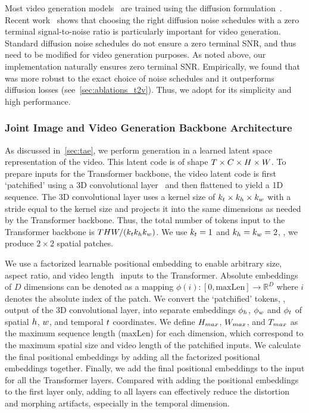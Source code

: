 Most video generation models~\citep{ho2022imagen,emuvideo2023,Blattmann2023AlignYL,singer2023makeavideo} are trained using the diffusion formulation~\citep{pmlr-v37-sohl-dickstein15,Ho2020DenoisingDP,ho2022imagen}.
Recent work~\citep{emuvideo2023,lin2024common} shows that choosing the right diffusion noise schedules with a zero terminal signal-to-noise ratio is particularly important for video generation.
Standard diffusion noise schedules do not ensure a zero terminal SNR, and thus need to be modified for video generation purposes.
As noted above, our \flowmatching implementation naturally ensures zero terminal SNR.
Empirically, we found that \flowmatching was more robust to the exact choice of noise schedules and it outperforms diffusion losses (see~\cref{sec:ablations_t2v}).
Thus, we adopt \flowmatching for its simplicity and high performance.

\subsubsection {Joint Image and Video Generation Backbone Architecture} \label{t2v_architecture_details}%
As discussed in~\cref{sec:tae}, we perform generation in a learned latent space representation of the video.
This latent code is of shape $T\times C\times H\times W$.
To prepare inputs for the Transformer backbone, the video latent code is first `patchified' using a 3D convolutional layer~\citep{dosovitskiy2020image} and then flattened to yield a 1D sequence.
The 3D convolutional layer uses a kernel size of $k_{t}\times k_{h}\times k_{w}$ with a stride equal to the kernel size and projects it into the same dimensions as needed by the Transformer backbone.
Thus, the total number of tokens input to the Transformer backbone is $THW/(k_{t}k_{h}k_{w})$.
We use $k_{t}=1$ and $k_{h}=k_{w}=2$, \ie, we produce $2\times2$ spatial patches.

We use a factorized learnable positional embedding to enable arbitrary size, aspect ratio, and video length~\citep{dehghani2024patch} inputs to the Transformer.
Absolute embeddings of $D$ dimensions can be denoted as a mapping $\phi(i): [0, \mathrm{maxLen}] \rightarrow \mathbb{R}^{D}$
where $i$ denotes the absolute index of the patch.
We convert the `patchified' tokens, \ie, output of the 3D convolutional layer, into separate embeddings $\phi_{h}$, $\phi_{w}$ and $\phi_{t}$ of spatial $h$, $w$, and temporal $t$ coordinates.
We define $H_{max}$, $W_{max}$, and $T_{max}$ as the maximum sequence length ($\mathrm{maxLen}$) for each dimension, which correspond to the maximum spatial size and video length of the patchified inputs.
We calculate the final positional embeddings by adding all the factorized positional embeddings together.
Finally, we add the final positional embeddings to the input for all the Transformer layers.
Compared with adding the positional embeddings to the first layer only, adding to all layers can effectively reduce the distortion and morphing artifacts, especially in the temporal dimension.

